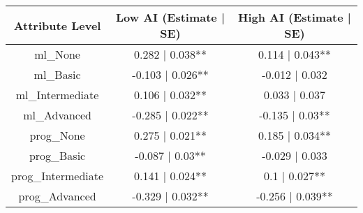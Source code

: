 \begin{table}[t]
\fontsize{12.0pt}{14.4pt}\selectfont
\begin{tabular*}{\linewidth}{@{\extracolsep{\fill}}ccc}
\toprule
Attribute Level & Low AI (Estimate | SE) & High AI (Estimate | SE) \\ 
\midrule\addlinespace[2.5pt]
ml\_None & 0.282 | 0.038** & 0.114 | 0.043** \\ 
ml\_Basic & -0.103 | 0.026** & -0.012 | 0.032 \\ 
ml\_Intermediate & 0.106 | 0.032** & 0.033 | 0.037 \\ 
ml\_Advanced & -0.285 | 0.022** & -0.135 | 0.03** \\ 
prog\_None & 0.275 | 0.021** & 0.185 | 0.034** \\ 
prog\_Basic & -0.087 | 0.03** & -0.029 | 0.033 \\ 
prog\_Intermediate & 0.141 | 0.024** & 0.1 | 0.027** \\ 
prog\_Advanced & -0.329 | 0.032** & -0.256 | 0.039** \\ 
\bottomrule
\end{tabular*}
\end{table}

